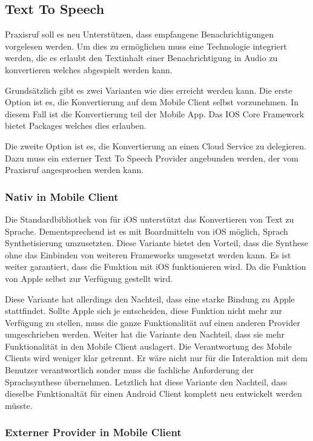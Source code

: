 \subsection{Text To Speech}

Praxisruf soll es neu Unterstützen, dass empfangene Benachrichtigungen vorgelesen werden.
Um dies zu ermöglichen muss eine Technologie integriert werden, die es erlaubt den Textinhalt einer Benachrichtigung
in Audio zu konvertieren welches abgespielt werden kann.

Grundsätzlich gibt es zwei Varianten wie dies erreicht werden kann.
Die erste Option ist es, die Konvertierung auf dem Mobile Client selbst vorzunehmen.
In diesem Fall ist die Konvertierung teil der Mobile App.
Das IOS Core Framework bietet Packages welches dies erlauben.

Die zweite Option ist es, die Konvertierung an einen Cloud Service zu delegieren.
Dazu muss ein externer Text To Speech Provider angebunden werden, der vom Praxisruf angesprochen werden kann.

\subsubsection*{Nativ in Mobile Client}

Die Standardbibliothek von für iOS unterstützt das Konvertieren von Text zu Sprache.\cite{ios_speech_synthesis}
Dementsprechend ist es mit Boardmitteln von iOS möglich, Sprach Synthetisierung umzusetzten.
Diese Variante bietet den Vorteil, dass die Synthese ohne das Einbinden von weiteren Frameworks umgesetzt werden kann.
Es ist weiter garantiert, dass die Funktion mit iOS funktionieren wird.
Da die Funktion von Apple selbst zur Verfügung gestellt wird.

Diese Variante hat allerdings den Nachteil, dass eine starke Bindung zu Apple stattfindet.
Sollte Apple sich je entscheiden, diese Funktion nicht mehr zur Verfügung zu stellen, muss die ganze Funktionalität
auf einen anderen Provider umgeschrieben werden.
Weiter hat die Variante den Nachteil, dass sie mehr Funktionalität in den Mobile Client auslagert.
Die Verantwortung des Mobile Clients wird weniger klar getrennt.
Er wäre nicht nur für die Interaktion mit dem Benutzer verantwortlich sonder muss die fachliche Anforderung der Sprachsynthese übernehmen.
Letztlich hat diese Variante den Nachteil, dass dieselbe Funktionaltät für einen Android Client komplett neu entwickelt werden müsste.

\subsubsection*{Externer Provider in Mobile Client}


